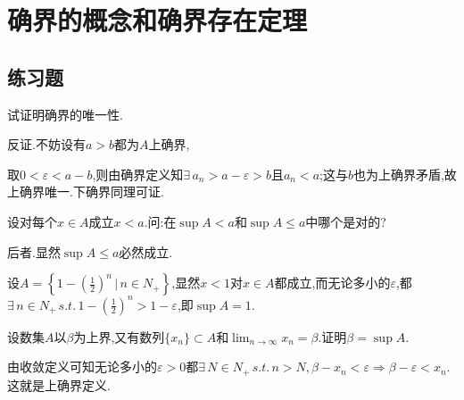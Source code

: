 \section{确界的概念和确界存在定理}
 \subsection{练习题}
     \begin{exercise}
         试证明确界的唯一性.
     \end{exercise}
     \begin{solution}
         反证.不妨设有$a>b$都为$A$上确界,

         取$0<\varepsilon<a-b$,则由确界定义知$\exists\, a_n>a-\varepsilon>b$且$a_n<a$;这与$b$也为上确界矛盾,故上确界唯一.下确界同理可证.
     \end{solution}

     \begin{exercise}
         设对每个$x\in A$成立$x<a$.问:在$\sup A<a$和$\sup A\leqslant a$中哪个是对的?
     \end{exercise}

     \begin{solution}
         后者.显然$\sup A\leqslant a$必然成立.

         设$A=\left\{1-(\frac{1}{2})^n\,\bigg\lvert\,n\in N_+\right\}$,显然$x<1$对$x\in A$都成立,而无论多小的$\varepsilon$,都$\exists\,n\in N_+\,s.t.\,1-(\frac{1}{2})^n>1-\varepsilon$,即$\sup A=1$.
     \end{solution}

     \begin{exercise}
         设数集$A$以$\beta$为上界,又有数列$\{x_n\}\subset A$和$\lim_{n\to\infty}x_n=\beta.$证明$\beta=\sup A$.
     \end{exercise}

     \begin{solution}
         由收敛定义可知无论多小的$\varepsilon>0$都$\exists\,N\in N_+\,s.t.\,n>N,\beta-x_n<\varepsilon\Rightarrow\beta-\varepsilon<x_n$.这就是上确界定义.
     \end{solution}


